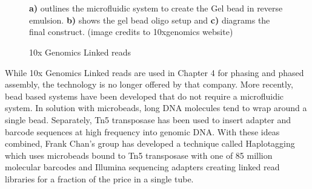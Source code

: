 \begin{figure}[htbp!]

\caption{10x Genomics Linked reads}
\label{figure:linkedreads}
\begin{centering}
 \\
 \\
\par{\textbf{a)} outlines the microfluidic system to create the Gel bead in reverse emulsion. \textbf{b)} shows the gel bead oligo setup and \textbf{c)} diagrams the final construct. (image credits to 10xgenomics website)}
\end{centering}
\end{figure}

\par{
While 10x Genomics Linked reads are used in Chapter 4 for phasing and phased assembly, the technology is no longer offered by that company. More recently, bead based systems have been developed that do not require a microfluidic system. In solution with microbeads, long DNA molecules tend to wrap around a single bead\cite{beadphasing}\cite{LFR}. Separately, Tn5 transposase has been used to insert adapter and barcode sequences at high frequency into genomic DNA\cite{cptseq}. With these ideas combined, Frank Chan's group has developed a technique called Haplotagging which uses microbeads bound to Tn5 transposase with one of 85 million molecular barcodes and Illumina sequencing adapters creating linked read libraries for a fraction of the price in a single tube\cite{haplotagging}.
}


